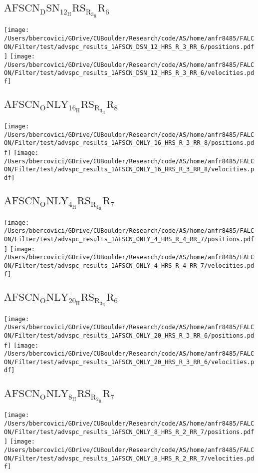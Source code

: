 \subsection{$\mathrm{AFSCN_DSN_12_HRS_R_3_RR_6}$}
\texttt{[image: /Users/bbercovici/GDrive/CUBoulder/Research/code/AS/home/anfr8485/FALCON/Filter/test/advspc\_results\_1AFSCN\_DSN\_12\_HRS\_R\_3\_RR\_6/positions.pdf]}
\texttt{[image: /Users/bbercovici/GDrive/CUBoulder/Research/code/AS/home/anfr8485/FALCON/Filter/test/advspc\_results\_1AFSCN\_DSN\_12\_HRS\_R\_3\_RR\_6/velocities.pdf]}
\subsection{$\mathrm{AFSCN_ONLY_16_HRS_R_3_RR_8}$}
\texttt{[image: /Users/bbercovici/GDrive/CUBoulder/Research/code/AS/home/anfr8485/FALCON/Filter/test/advspc\_results\_1AFSCN\_ONLY\_16\_HRS\_R\_3\_RR\_8/positions.pdf]}
\texttt{[image: /Users/bbercovici/GDrive/CUBoulder/Research/code/AS/home/anfr8485/FALCON/Filter/test/advspc\_results\_1AFSCN\_ONLY\_16\_HRS\_R\_3\_RR\_8/velocities.pdf]}
\subsection{$\mathrm{AFSCN_ONLY_4_HRS_R_4_RR_7}$}
\texttt{[image: /Users/bbercovici/GDrive/CUBoulder/Research/code/AS/home/anfr8485/FALCON/Filter/test/advspc\_results\_1AFSCN\_ONLY\_4\_HRS\_R\_4\_RR\_7/positions.pdf]}
\texttt{[image: /Users/bbercovici/GDrive/CUBoulder/Research/code/AS/home/anfr8485/FALCON/Filter/test/advspc\_results\_1AFSCN\_ONLY\_4\_HRS\_R\_4\_RR\_7/velocities.pdf]}
\subsection{$\mathrm{AFSCN_ONLY_20_HRS_R_3_RR_6}$}
\texttt{[image: /Users/bbercovici/GDrive/CUBoulder/Research/code/AS/home/anfr8485/FALCON/Filter/test/advspc\_results\_1AFSCN\_ONLY\_20\_HRS\_R\_3\_RR\_6/positions.pdf]}
\texttt{[image: /Users/bbercovici/GDrive/CUBoulder/Research/code/AS/home/anfr8485/FALCON/Filter/test/advspc\_results\_1AFSCN\_ONLY\_20\_HRS\_R\_3\_RR\_6/velocities.pdf]}
\subsection{$\mathrm{AFSCN_ONLY_8_HRS_R_2_RR_7}$}
\texttt{[image: /Users/bbercovici/GDrive/CUBoulder/Research/code/AS/home/anfr8485/FALCON/Filter/test/advspc\_results\_1AFSCN\_ONLY\_8\_HRS\_R\_2\_RR\_7/positions.pdf]}
\texttt{[image: /Users/bbercovici/GDrive/CUBoulder/Research/code/AS/home/anfr8485/FALCON/Filter/test/advspc\_results\_1AFSCN\_ONLY\_8\_HRS\_R\_2\_RR\_7/velocities.pdf]}
